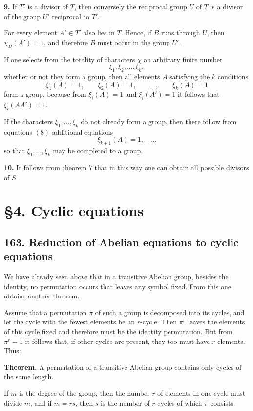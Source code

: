 \documentclass[11pt,a4paper]{book}
\begin{document}
\medskip
\noindent\textbf{9.} If \(T'\) is a divisor of \(T\), then conversely the reciprocal group \(U\) of \(T\) is a divisor of the group \(U'\) reciprocal to \(T'\).

\medskip
For every element \(A'\in T'\) also lies in \(T\). Hence, if \(B\) runs through \(U\), then \(\chi_B(A')=1\), and therefore \(B\) must occur in the group \(U'\).

If one selects from the totality of characters \(\chi\) an arbitrary finite number
\[
\xi_1,\xi_2,\dots,\xi_k,
\]
whether or not they form a group, then all elements \(A\) satisfying the \(k\) conditions
\[
\xi_1(A)=1,\qquad
\xi_2(A)=1,\qquad
\dots,\qquad
\xi_k(A)=1
\tag{8}
\]
form a group, because from \(\xi_i(A)=1\) and \(\xi_i(A')=1\) it follows that \(\xi_i(AA')=1\).

If the characters \(\xi_1,\dots,\xi_k\) do not already form a group, then there follow from equations \((8)\) additional equations
\[
\xi_{k+1}(A)=1,\quad \dots
\]
so that \(\xi_1,\dots,\xi_k\) may be completed to a group.

\medskip
\noindent\textbf{10.} It follows from theorem 7 that in this way one can obtain all possible divisors of \(S\).

\medskip
\section*{\S 4. Cyclic equations}

\subsection*{163. Reduction of Abelian equations to cyclic equations}

We have already seen above that in a transitive Abelian group, besides the identity, no permutation occurs that leaves any symbol fixed. From this one obtains another theorem.

Assume that a permutation $\pi$ of such a group is decomposed into its cycles, and let the cycle with the fewest elements be an $r$-cycle. Then $\pi^r$ leaves the elements of this cycle fixed and therefore must be the identity permutation. But from $\pi^r = 1$ it follows that, if other cycles are present, they too must have $r$ elements. Thus:

\medskip
\noindent\textbf{Theorem.}
A permutation of a transitive Abelian group contains only cycles of the same length.

\medskip
If $m$ is the degree of the group, then the number $r$ of elements in one cycle must divide $m$, and if $m = rs$, then $s$ is the number of $r$-cycles of which $\pi$ consists.
\end{document}
